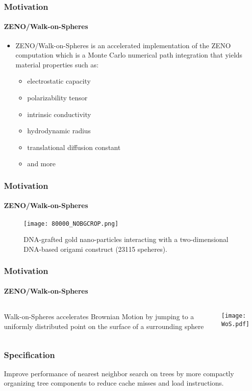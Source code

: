 
\begin{frame}
  \frametitle{Motivation}
  \framesubtitle{ZENO/Walk-on-Spheres}

  \begin{itemize}
    \item ZENO/Walk-on-Spheres is an accelerated implementation of the ZENO computation which is a Monte Carlo
      numerical path integration that yields material properties such as:
    \begin{itemize}
      \item electrostatic capacity
      \item polarizability tensor
      \item intrinsic conductivity 
      \item hydrodynamic radius
      \item translational diffusion constant
      \item and more
    \end{itemize}
  \end{itemize}

\end{frame}

\begin{frame}
  \frametitle{Motivation}
  \framesubtitle{ZENO/Walk-on-Spheres}

  \begin{figure}
    \centering
    \texttt{[image: 80000\_NOBGCROP.png]}
    \caption{DNA-grafted gold nano-particles interacting with a 
    two-dimensional DNA-based origami construct (23115 speheres).}
    \label{fig:80000}
  \end{figure}
\end{frame}

\begin{frame}
  \frametitle{Motivation}
  \framesubtitle{ZENO/Walk-on-Spheres}

  \begin{columns}[T]
    \begin{column}{.5\textwidth}
      \begin{block}{}%
        {\color{white} Walk-on-Spheres accelerates Brownian Motion by jumping %
          to a uniformly distributed point on the surface of a surrounding sphere}
      \end{block}
    \end{column}
    \begin{column}{.5\textwidth}
      \begin{block}{}
        \texttt{[image: WoS.pdf]}
      \end{block}
    \end{column}
  \end{columns}
\end{frame}

\begin{frame}
  \frametitle{Specification}

  {\color{white}
  Improve performance of nearest neighbor search on \kd trees by more compactly organizing tree components
  to reduce cache misses and load instructions.}

\end{frame}
